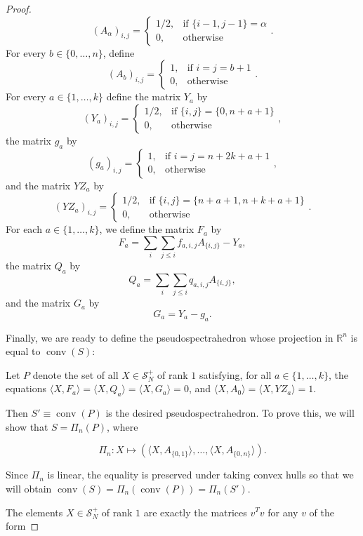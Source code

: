 \documentclass[11pt]{article} %
\newcommand{\R}{\mathbb{R}}
\newcommand{\s}{\mathcal{S}}
\DeclareMathOperator{\conv}{conv}
\begin{document}
\begin{proof}
\[ (A_\alpha)_{i,j} =
 \begin{cases}
1\slash 2, & \text{if }\{i-1,j-1\}=\alpha \\
0, & \text{otherwise }
\end{cases}.\]
For every $b \in \{0,\ldots,n\}$, define
\[ (A_b)_{i,j} =
 \begin{cases}
1, & \text{if } i = j = b+1 \\
0, & \text{otherwise }
\end{cases}.\]
For every $a \in \{1,\ldots,k\}$ define the matrix $Y_a$ by
\[ (Y_a)_{i,j} =
 \begin{cases}
1\slash 2, & \text{if } \{i , j\} =\{0, n+a+1\} \\
0, & \text{otherwise }
\end{cases},\]
the matrix $g_a$ by
\[ (g_a)_{i,j} =
 \begin{cases}
1, & \text{if } i = j =n+2k+a+1  \\
0, & \text{otherwise }
\end{cases},\]
and the matrix $YZ_a$ by
\[ (YZ_a)_{i,j} =
 \begin{cases}
1\slash 2, & \text{if } \{i,j\}=\{n+a+1,n+k+a+1\}  \\
0, & \text{otherwise }
\end{cases}.\]
For each $a \in \{1,\ldots,k\}$, we define the matrix $F_a$ by
\[F_a =\sum_i \sum_{j\leq i} f_{a,i,j} A_{\{i,j\}}-Y_a,\]
the matrix $Q_a$ by 
\[Q_a = \sum_i \sum_{j\leq i} q_{a,i,j} A_{\{i,j\}}, \]
and the matrix $G_a$ by
\[G_a = Y_a - g_a.\]



Finally, we are ready to define the pseudospectrahedron whose projection in $\R^n$ is equal to $\conv(S)$:

Let $P$ denote the set of all $X \in \s_N^+$ of rank $1$ satisfying, for all $a \in \{1,\ldots,k\}$, the equations $\langle X, F_a\rangle=\langle X,Q_a\rangle =\langle X,G_a\rangle=0$, and $\langle X,A_0\rangle = \langle X, YZ_a \rangle = 1$. 

Then $S' \equiv \conv(P)$ is the desired pseudospectrahedron. To prove this, we will show that $S = \Pi_n(P)$, where

 \[\Pi_n : X \mapsto (\langle X, A_{\{0,1\}}\rangle,\ldots,\langle X, A_{\{0,n\}}\rangle).\] 

Since $\Pi_n$ is linear, the equality is preserved under taking convex hulls so that we will obtain $\conv(S) = \Pi_n(\conv(P))= \Pi_n(S')$.

The elements $X \in \s_N^+$ of rank $1$ are exactly the matrices $v^Tv$ for any $v$ of the form


\end{proof}
\end{document}
